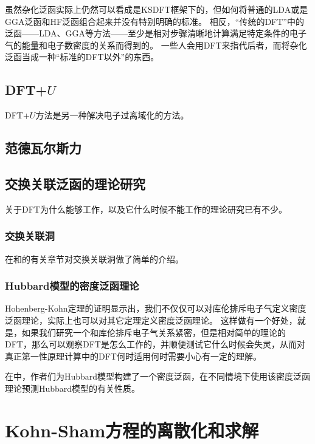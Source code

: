 虽然杂化泛函实际上仍然可以看成是KSDFT框架下的，但如何将普通的LDA或是GGA泛函和HF泛函组合起来并没有特别明确的标准。
相反，“传统的DFT”中的泛函——LDA、GGA等方法——至少是相对步骤清晰地计算满足特定条件的电子气的能量和电子数密度的关系而得到的。
一些人会用DFT来指代后者，而将杂化泛函当成一种“标准的DFT以外”的东西。

\subsection{DFT+$U$}

DFT+$U$方法是另一种解决电子过离域化的方法。

\subsection{范德瓦尔斯力}

\subsection{交换关联泛函的理论研究}

关于DFT为什么能够工作，以及它什么时候不能工作的理论研究已有不少。

\subsubsection{交换关联洞}

在\cite{Pribram_Jones_2015}和\cite{Engel2011}的有关章节对交换关联洞做了简单的介绍。

\subsubsection{Hubbard模型的密度泛函理论}

Hohenberg-Kohn定理的证明显示出，我们不仅仅可以对库伦排斥电子气定义密度泛函理论，实际上也可以对其它定理定义密度泛函理论。
这样做有一个好处，就是，如果我们研究一个和库伦排斥电子气关系紧密，但是相对简单的理论的DFT，那么可以观察DFT是怎么工作的，并顺便测试它什么时候会失灵，从而对真正第一性原理计算中的DFT何时适用何时需要小心有一定的理解。

在\cite{capelle2003density}中，作者们为Hubbard模型构建了一个密度泛函，在不同情境下使用该密度泛函理论预测Hubbard模型的有关性质。

\section{Kohn-Sham方程的离散化和求解}

